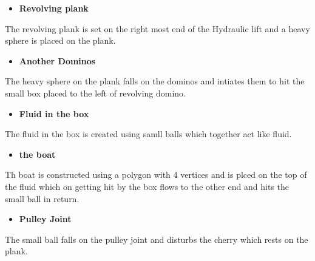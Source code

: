 \documentclass{article}
\begin{document}
\begin{itemize}
        \begin{itemize}[label=$\blacksquare$] \vspace{0cm}
            \item \textbf{\Large Revolving plank } 
        \end{itemize}
        \large The revolving plank is set on the right most end of the Hydraulic lift and a heavy sphere is placed on the plank.\\ \vspace{0.2 cm}
\newpage
        \begin{itemize}[label=$\blacksquare$] \vspace{0cm}
            \item \textbf{\Large Another Dominos } 
        \end{itemize}
        \large The heavy sphere on the plank falls on the dominos and intiates them to hit the small box placed to the left of revolving domino.\\ \vspace{0.2 cm}

        \begin{itemize}[label=$\blacksquare$] \vspace{0cm}
            \item \textbf{\Large Fluid in the box } 
        \end{itemize}
        \large The fluid in the box is created using samll balls which together act like fluid.\\ \vspace{0.65 cm}

        \begin{itemize}[label=$\blacksquare$] \vspace{0cm}
            \item \textbf{\Large the boat} 
        \end{itemize}
        \large Th boat is constructed using a polygon with 4 vertices and is plced on the top of the fluid which on getting hit by the box flows to the other end and hits the small ball in return. \\ \vspace{0.65 cm}

        \begin{itemize}[label=$\blacksquare$] \vspace{0cm}
            \item \textbf{\Large Pulley Joint} 
        \end{itemize}
        \large The small ball falls on the pulley joint and disturbs the cherry which rests on the plank.\\ \vspace{0.65 cm}
        

\end{itemize}
\end{document}
